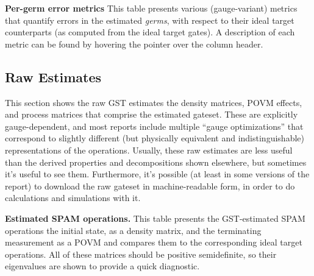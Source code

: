 \documentclass{article}[11pt]
\newcommand{\putfield}[2]{#2}
\begin{document}
{\begin{table}[h]
  \begin{center}
    \begin{adjustbox}{max width=\textwidth}
      \putfield{final_gates_vs_target_table_gauge_vargerms}{}
    \end{adjustbox}
    \caption{\textbf{Per-germ error metrics} This table presents various (gauge-variant) metrics that quantify errors in the estimated \emph{germs}, with respect to their ideal target counterparts (as computed from the ideal target gates).  A description of each metric can be found by  hovering the pointer over the column header.}
  \end{center}
\end{table}


\subsection{Raw Estimates\label{sec_raw_estimates}}
This section shows the raw GST estimates \textendash the density matrices, POVM effects, and process matrices that comprise the estimated gateset.  These are explicitly gauge-dependent, and most reports include multiple ``gauge optimizations'' that correspond to slightly different (but physically equivalent and indistinguishable) representations  of the operations.  Usually, these raw estimates are less useful than the derived properties and decompositions shown elsewhere, but sometimes it's useful to see them.  Furthermore, it's possible (at least in some versions of the report) to download the raw gateset in machine-readable form, in order to do calculations and simulations with it.

\begin{table}[h]
  \begin{center}
    \begin{adjustbox}{max width=\textwidth}
      \putfield{final_model_brief_spam_table}{}
    \end{adjustbox}
    \caption{\textbf{Estimated SPAM operations.} This table presents the GST-estimated SPAM operations \textendash the initial state, as a density matrix, and the terminating measurement as a POVM \textendash and compares them to the corresponding ideal target operations.  All of these matrices should be positive semidefinite, so their eigenvalues are shown to provide a quick diagnostic.}
  \end{center}
\end{table}


}
\end{document}

